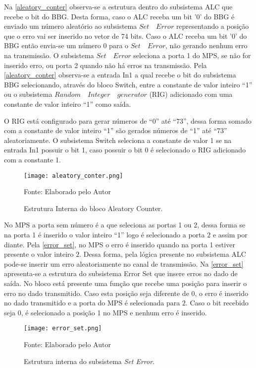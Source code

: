 Na \autoref{aleatory_conter} observa-se a estrutura dentro do subsistema ALC que recebe o bit do BBG. Desta forma, caso o ALC receba um bit '0' do BBG é enviado um número aleatório ao subsistema $Set \quad Error$ representando a posição que o erro vai ser inserido no vetor de 74 bits. Caso o ALC receba um bit '0' do BBG então envia-se um número 0 para o $Set \quad Error$, não gerando nenhum erro na transmissão. O subsistema $Set \quad Error$ seleciona a porta 1 do MPS, se não for inserido erro, ou porta 2 quando não há erros na transmissão. Pela \autoref{aleatory_conter} observa-se a entrada In1 a qual recebe o bit do subsistema BBG selecionando,  através do bloco Switch, entre a constante de valor inteiro “1” ou o subsistema $Random \quad Integer \quad generator$ (RIG) adicionado com uma constante de valor inteiro “1” como saída.

O RIG está configurado para gerar números de “0” até “73”, dessa forma somado com a constante de valor inteiro “1” são gerados números de “1” até “73” aleatoriamente. O subsistema Switch seleciona a constante de valor 1 se na entrada In1 possuir o bit 1, caso possuir o bit 0 é selecionado o RIG adicionado com a constante 1. 

\begin{figure}[H]
	\caption{\label{aleatory_conter} Estrutura Interna do bloco Aleatory Counter.}
	\centering
	\texttt{[image: aleatory\_conter.png]}
	\begin{center}
		Fonte: Elaborado pelo Autor
	\end{center}	
\end{figure}

No MPS a porta sem número é a que seleciona as portas 1 ou 2, dessa forma se na porta 1 é inserido o valor inteiro “1” logo é selecionado a porta $2$ e assim por diante. Pela \autoref{error_set}, no MPS o erro é inserido quando na porta 1 estiver presente o valor inteiro $2$. Dessa forma, pela lógica presente no subsistema ALC pode-se inserir um erro aleatoriamente no canal de transmissão. Na \autoref{error_set} apresenta-se a estrutura do subsistema Error Set que insere erros no dado de saída. No bloco está presente uma função que recebe uma posição para inserir o erro no dado transmitido. Caso esta posição seja diferente de 0, o erro é inserido no dado transmitido e a porta do MPS é selecionada para $2$. Caso o bit recebido seja $0$, é selecionado a posição 1 no MPS e nenhum erro é inserido.

\begin{figure}[H]
	\caption{\label{error_set} Estrutura interna do subsistema \textit{Set Error}.}
	\centering
	\texttt{[image: error\_set.png]}
	\begin{center}
		Fonte: Elaborado pelo Autor
	\end{center}	
\end{figure}

